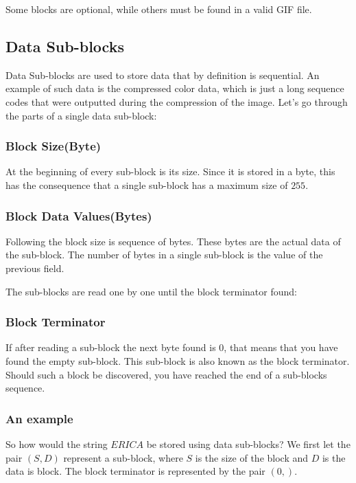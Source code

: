 Some blocks are optional, while others must be found in a valid GIF
file.

\subsection{Data Sub-blocks}
\label{sec:gif-data-sub-blocks}

Data Sub-blocks are used to store data that by definition is
sequential. An example of such data is the compressed color data,
which is just a long sequence codes that were outputted during the
compression of the image. Let's go through the parts of a single data
sub-block:

\subsubsection*{Block Size(Byte)}

At the beginning of every sub-block is its size. Since it is stored in
a byte, this has the consequence that a single sub-block has a maximum
size of $255$.

\subsubsection*{Block Data Values(Bytes)}

Following the block size is sequence of bytes. These bytes are the
actual data of the sub-block. The number of bytes in a single
sub-block is the value of the previous field.

The sub-blocks are read one by one until the block terminator found:

\subsubsection{Block Terminator}

If after reading a sub-block the next byte found is 0, that means
that you have found the empty sub-block. This sub-block is also
known as the block terminator. Should such a block be discovered, you
have reached the end of a sub-blocks sequence.

\subsubsection{An example}

So how would the string $ERICA$ be stored using data sub-blocks? We
first let the pair $(S,D)$ represent a sub-block, where $S$ is the
size of the block and $D$ is the data is block. The block terminator
is represented by the pair $(0,)$.

